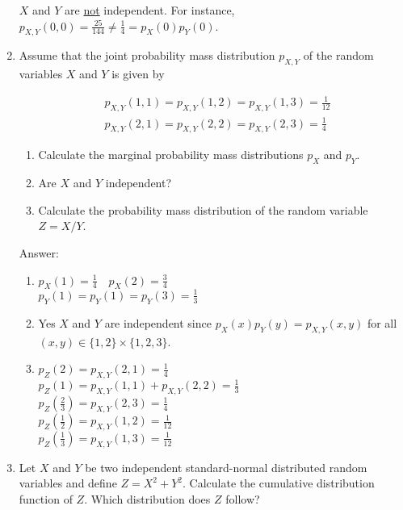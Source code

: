 \documentclass{article}
\begin{document}
\begin{enumerate}
$X$ and $Y$ are \underline{not} independent. For instance, $p_{X,Y}(0,0) = \frac{25}{144} \neq \frac{1}{4} = p_X(0)p_Y(0)$. 

\newpage
\item

Assume that the joint probability mass distribution $p_{X,Y}$ of the random variables $X$ and
$Y$ is given by

\begin{align*}
&p_{X,Y}(1,1) = p_{X,Y}(1,2) = p_{X,Y}(1,3) = \frac{1}{12} \\
&p_{X,Y}(2,1) = p_{X,Y}(2,2) = p_{X,Y}(2,3) = \frac{1}{4}
\end{align*}

\begin{enumerate}
\item
Calculate the marginal probability mass distributions $p_X$ and $p_Y$.

\item
Are $X$ and $Y$ independent?

\item
Calculate the probability mass distribution of the random variable $Z = X/Y$.
\end{enumerate}

Answer:

\begin{enumerate}
\item
$p_X(1) = \frac{1}{4} \quad p_X(2) = \frac{3}{4}$\\
$p_Y(1) = p_Y(1) = p_Y(3) = \frac{1}{3}$

\item
Yes $X$ and $Y$ are independent since $p_X(x)p_Y(y) = p_{X,Y}(x,y)$ for all $(x,y) \in \{1,2\} \times \{1,2,3\}$.

\item
$p_Z(2) = p_{X,Y}(2,1) = \frac{1}{4}$\\
$p_Z(1) = p_{X,Y}(1,1) + p_{X,Y}(2,2) = \frac{1}{3}$\\
$p_Z\left(\frac{2}{3}\right) = p_{X,Y}(2,3) = \frac{1}{4}$\\
$p_Z\left(\frac{1}{2}\right) = p_{X,Y}(1,2) = \frac{1}{12}$\\
$p_Z\left(\frac{1}{3}\right) = p_{X,Y}(1,3) = \frac{1}{12}$
\end{enumerate}

\item
Let $X$ and $Y$ be two independent standard-normal distributed random variables and
define $Z = X^2 + Y^2$. Calculate the cumulative distribution function of $Z$. Which
distribution does $Z$ follow?\\


\end{enumerate}
\end{document}
